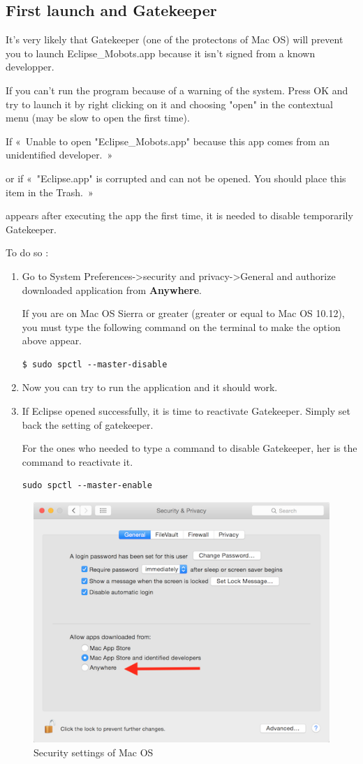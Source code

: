 \documentclass[a4paper]{article}
\begin{document}
\subsection{First launch and Gatekeeper}

It's very likely that Gatekeeper (one of the protectons of Mac OS) will prevent you to launch Eclipse\_Mobots.app because it isn't signed from a known developper. 

If you can't run the program because of a warning of the system. Press OK and try to launch it by right clicking on it and choosing "open" in the contextual menu (may be slow to open the first time).

If « Unable to open "Eclipse\_Mobots.app" because this app comes from an unidentified developer. »  

or if « "Eclipse.app" is corrupted and can not be opened. You should place this item in the Trash. »

appears after executing the app the first time, it is needed to disable temporarily Gatekeeper.

To do so :
\begin{enumerate}
\item Go to System Preferences->security and privacy->General and authorize downloaded application from \textbf{Anywhere}.

If you are on Mac OS Sierra or greater (greater or equal to Mac OS 10.12), you must type the following command on the terminal to make the option above appear.
\begin{lstlisting}
$ sudo spctl --master-disable
\end{lstlisting}
\item Now you can try to run the application and it should work.
\item If Eclipse opened successfully, it is time to reactivate Gatekeeper. Simply set back the setting of gatekeeper.

For the ones who needed to type a command to disable Gatekeeper, her is the command to reactivate it.
\begin{lstlisting}
sudo spctl --master-enable
\end{lstlisting}
\end{enumerate}

\begin{figure}[!h]
\centering
\includegraphics[width=0.7\columnwidth]{fig/security_tab_mac}
\caption{Security settings of Mac OS}
\label{fig:security_tab_mac}
\end{figure}
\end{document}
